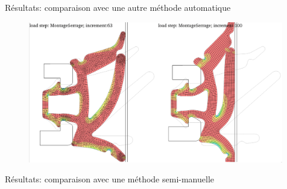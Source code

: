 \begin{frame}{Résultats: comparaison avec une autre méthode automatique}
    \begin{figure}
        \centering
        \includegraphics[width=0.99\textwidth]{img/quadsimu/comparison_with_bad_quality_mesh.PNG}
    \end{figure}
\end{frame}

\begin{frame}{Résultats: comparaison avec une méthode semi-manuelle}
    \begin{figure}
        \centering
	\end{figure}
\end{frame}
